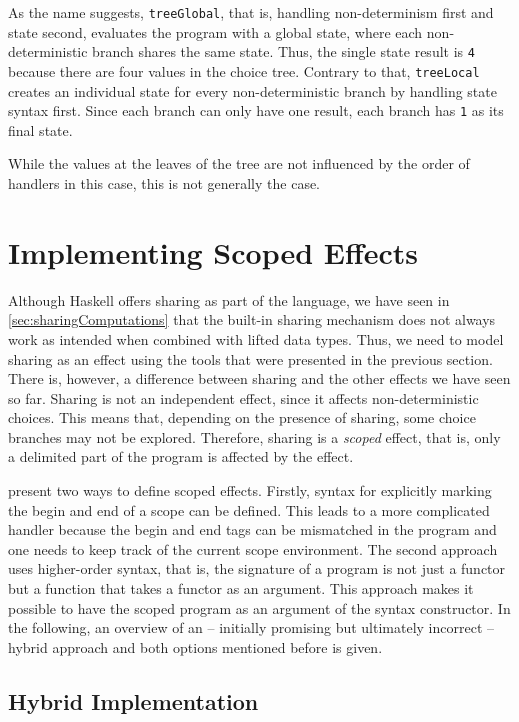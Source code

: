 \documentclass[a4paper, 11pt, fleqn, twoside, abstract=on]{scrreprt}
\newcommand{\hinl}[1]{\texttt{#1}}
\begin{document}
\vspace{0.32cm}

As the name suggests, \hinl{treeGlobal}, that is, handling non-determinism first and state second, evaluates the program with a global state, where each non-deterministic branch shares the same state.
Thus, the single state result is \hinl{4} because there are four values in the choice tree.
Contrary to that, \hinl{treeLocal} creates an individual state for every non-deterministic branch by handling state syntax first.
Since each branch can only have one result, each branch has \hinl{1} as its final state.

While the values at the leaves of the tree are not influenced by the order of handlers in this case, this is not generally the case.

\section{Implementing Scoped Effects}
\label{sec:sharing}

Although Haskell offers sharing as part of the language, we have seen in \autoref{sec:sharingComputations} that the built-in sharing mechanism does not always work as intended when combined with lifted data types.
Thus, we need to model sharing as an effect using the tools that were presented in the previous section.
There is, however, a difference between sharing and the other effects we have seen so far.
Sharing is not an independent effect, since it affects non-deterministic choices.
This means that, depending on the presence of sharing, some choice branches may not be explored.
Therefore, sharing is a \textit{scoped} effect, that is, only a delimited part of the program is affected by the effect.

\citet{wu2014effect} present two ways to define scoped effects.
Firstly, syntax for explicitly marking the begin and end of a scope can be defined.
This leads to a more complicated handler because the begin and end tags can be mismatched in the program and one needs to keep track of the current scope environment.
The second approach uses higher-order syntax, that is, the signature of a program is not just a functor but a function that takes a functor as an argument.
This approach makes it possible to have the scoped program as an argument of the syntax constructor.
In the following, an overview of an  -- initially promising but ultimately incorrect  -- hybrid approach and both options mentioned before is given.

\subsection{Hybrid Implementation}
\end{document}

